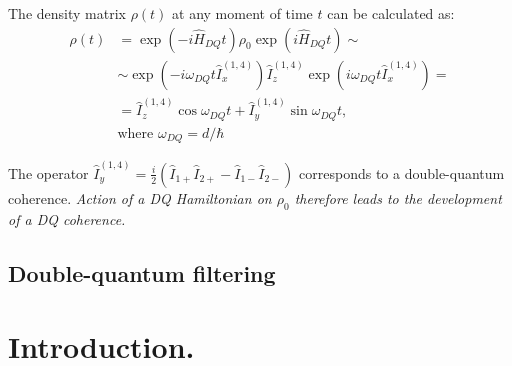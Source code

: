 \documentclass[a4paper, 12pt]{article}
\begin{document}
The density matrix $\rho(t)$ at any moment of time $t$  can be calculated as:
\begin{equation}
\begin{split}
\rho(t) &= \exp (-i\hat{H}_{DQ}t) \rho_0  \exp (i\hat{H}_{DQ}t) \sim \\
 &\sim \exp (-i \omega_{DQ} t \hat{I}_{x}^{(1,4)}) \hat{I}_{z}^{(1,4)}  \exp (i \omega_{DQ} t \hat{I}_{x}^{(1,4)}) = \\
 &= \hat{I}_{z}^{(1,4)} \cos{\omega_{DQ} t} +  \hat{I}_{y}^{(1,4)} \sin{\omega_{DQ} t}, \\
 & \text{where } \omega_{DQ} = d/\hbar
\end{split}
\end{equation}

The operator $\hat{I}_{y}^{(1,4)} = \frac{i}{2}( \hat{I}_{1+} \hat{I}_{2+} - \hat{I}_{1-} \hat{I}_{2-}) $ corresponds to a double-quantum coherence. \emph{Action of a DQ Hamiltonian on $\rho_0$ therefore leads to the development of a DQ coherence.} 

\subsection{Double-quantum filtering}

\section{Introduction.}





\end{document}

